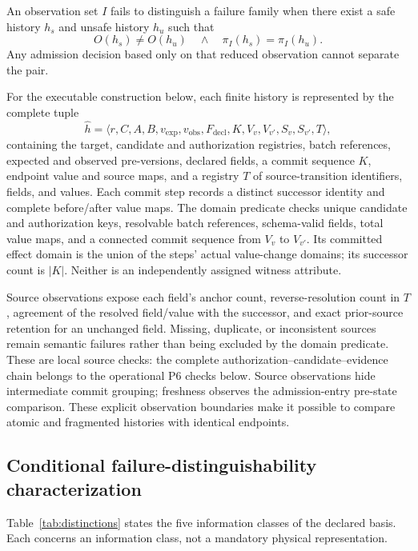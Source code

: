 An observation set $I$ fails to distinguish a failure family when there exist a safe history $h_s$ and unsafe history $h_u$ such that
\begin{equation}
O(h_s)\neq O(h_u)
\quad\land\quad
\pi_I(h_s)=\pi_I(h_u).
\label{eq:indistinguishable}
\end{equation}
Any admission decision based only on that reduced observation cannot separate the pair.

For the executable construction below, each finite history is represented by the complete tuple
\begin{equation}
\widehat h=\langle r,C,A,B,v_{\mathrm{exp}},v_{\mathrm{obs}},
F_{\mathrm{decl}},K,V_v,V_{v'},S_v,S_{v'},T\rangle,
\label{eq:witness-history}
\end{equation}
containing the target, candidate and authorization registries, batch references, expected and observed pre-versions, declared fields, a commit sequence $K$, endpoint value and source maps, and a registry $T$ of source-transition identifiers, fields, and values. Each commit step records a distinct successor identity and complete before/after value maps. The domain predicate checks unique candidate and authorization keys, resolvable batch references, schema-valid fields, total value maps, and a connected commit sequence from $V_v$ to $V_{v'}$. Its committed effect domain is the union of the steps' actual value-change domains; its successor count is $|K|$. Neither is an independently assigned witness attribute.

Source observations expose each field's anchor count, reverse-resolution count in $T$, agreement of the resolved field/value with the successor, and exact prior-source retention for an unchanged field. Missing, duplicate, or inconsistent sources remain semantic failures rather than being excluded by the domain predicate. These are local source checks: the complete authorization--candidate--evidence chain belongs to the operational P6 checks below. Source observations hide intermediate commit grouping; freshness observes the admission-entry pre-state comparison. These explicit observation boundaries make it possible to compare atomic and fragmented histories with identical endpoints.

\subsection{Conditional failure-distinguishability characterization}

Table~\ref{tab:distinctions} states the five information classes of the declared basis. Each concerns an information class, not a mandatory physical representation.


